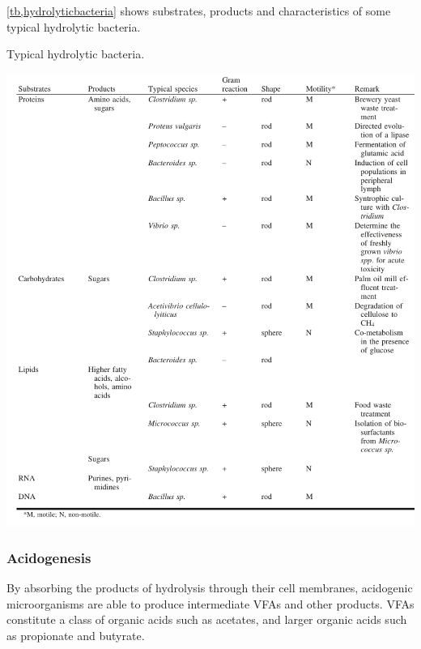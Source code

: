 \documentclass[fontsize=12pt,headsepline=true, bibliography=totocnumbered, twoside]{scrbook} %
\begin{document}
\autoref{tb,hydrolyticbacteria} shows substrates, products and characteristics of some typical hydrolytic bacteria.







\begin{table}
\center
\caption[Typical hydrolytic bacteria]{Typical hydrolytic bacteria.\citep{amani2010anaerobic}}


\vspace{0.3cm}

\includegraphics[scale=0.779]{hydrolyticbacteria}

\label{tb,hydrolyticbacteria}
\end{table}




 

\subsubsection{Acidogenesis}

By absorbing the products of hydrolysis through their cell membranes, acidogenic microorganisms are able to produce intermediate \ac{VFAs} and other products. \ac{VFAs} constitute a class of organic acids such as acetates, and larger organic acids such as propionate and butyrate\citep{patel}.
\end{document}
